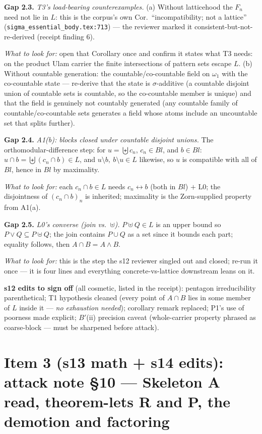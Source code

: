 \documentclass[11pt]{article}
\newcommand{\file}[1]{\texttt{\small #1}}
\newcommand{\gap}[1]{\medskip\noindent\textbf{Gap #1.}}
\newcommand{\lookfor}{\par\smallskip\noindent\emph{What to look for:} }
\begin{document}
\gap{2.3} \emph{T3's load-bearing counterexamples.} (a) Without
latticehood the $F_n$ need not lie in $L$: this is the corpus's own
Cor.\ ``incompatibility; not a lattice''
(\file{sigma\_essential\_body.tex:713}) --- the reviewer marked it
consistent-but-not-re-derived (receipt finding 6).
\lookfor open that Corollary once and confirm it states what T3 needs:
on the product Ulam carrier the finite intersections of pattern sets
escape $L$. (b) Without countable generation: the
countable/co-countable field on $\omega_1$ with the co-countable
state --- re-derive that the state is $\sigma$-additive (a countable
disjoint union of countable sets is countable, so the co-countable
member is unique) and that the field is genuinely not countably
generated (any countable family of countable/co-countable sets
generates a field whose atoms include an uncountable set that splits
further).

\gap{2.4} \emph{A1(b): blocks closed under countable disjoint unions.}
The orthomodular-difference step: for $u = \biguplus c_n$, $c_n \in
Bl$, and $b \in Bl$: $u \cap b = \biguplus (c_n \cap b) \in L$, and
$u \setminus b,\ b \setminus u \in L$ likewise, so $u$ is compatible
with all of $Bl$, hence in $Bl$ by maximality.
\lookfor each $c_n \cap b \in L$ needs $c_n \leftrightarrow b$ (both
in $Bl$) $+$ L0; the disjointness of $(c_n \cap b)_n$ is inherited;
maximality is the Zorn-supplied property from A1(a).

\gap{2.5} \emph{L0's converse (join vs.\ $\uplus$).} $P \uplus Q \in
L$ is an upper bound so $P \vee Q \subseteq P \uplus Q$; the join
contains $P \cup Q$ as a set since it bounds each part; equality
follows, then $A \cap B = A \wedge B$.
\lookfor this is the step the s12 reviewer singled out and closed;
re-run it once --- it is four lines and everything concrete-vs-lattice
downstream leans on it.

\smallskip\noindent\textbf{s12 edits to sign off} (all cosmetic, listed
in the receipt): pentagon irreducibility parenthetical; T1 hypothesis
cleaned (every point of $A \cap B$ lies in some member of $L$ inside
it --- \emph{no exhaustion needed}); corollary remark replaced;
P1's use of poorness made explicit; $B'$(ii) precision caveat
(whole-carrier property phrased as coarse-block --- must be sharpened
before attack).

\section{Item 3 (s13 math + s14 edits): attack note \S10 --- Skeleton
A read, theorem-lets R and P, the demotion and factoring}
\end{document}
